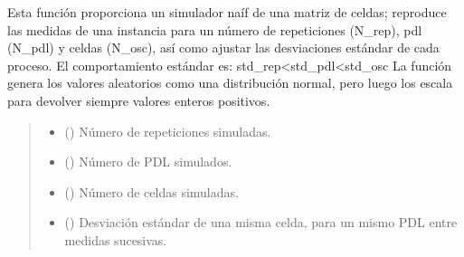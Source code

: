 \documentclass[letterpaper,10pt,english]{sphinxmanual}
\begin{document}
\begin{fulllineitems}
\label{\detokenize{fpga.ring_osc:fpga.ring_osc.sim_romatrix}}
\pysigstartsignatures
{}
\pysigstopsignatures
\sphinxAtStartPar
Esta función proporciona un simulador naíf de una matriz de celdas; reproduce las medidas de una instancia para un número de repeticiones (N\_rep), pdl (N\_pdl) y celdas (N\_osc), así como ajustar las desviaciones estándar de cada proceso. El comportamiento estándar es: std\_rep\textless{}std\_pdl\textless{}std\_osc La función genera los valores aleatorios como una distribución normal, pero luego los escala para devolver siempre valores enteros positivos.
\begin{quote}\begin{description}
\begin{itemize}
\item {} 
\sphinxAtStartPar
{} (\sphinxstyleliteralemphasis{\sphinxupquote{, }}) \textendash{} Número de repeticiones simuladas.

\item {} 
\sphinxAtStartPar
{} (\sphinxstyleliteralemphasis{\sphinxupquote{, }}) \textendash{} Número de PDL simulados.

\item {} 
\sphinxAtStartPar
{} (\sphinxstyleliteralemphasis{\sphinxupquote{, }}) \textendash{} Número de celdas simuladas.

\item {} 
\sphinxAtStartPar
{} (\sphinxstyleliteralemphasis{\sphinxupquote{, }}) \textendash{} Desviación estándar de una misma celda, para un mismo PDL entre
medidas sucesivas.


\end{itemize}
\end{description}
\end{quote}
\end{fulllineitems}
\end{document}
